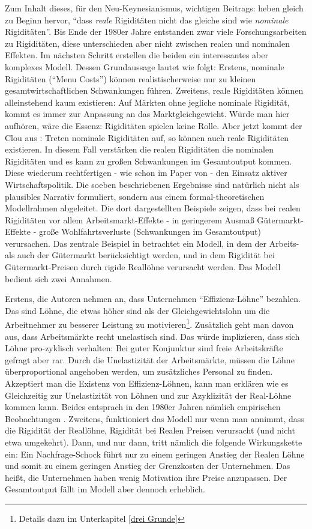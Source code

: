 Zum Inhalt dieses, für den Neu-Keynesianismus, wichtigen Beitrags: \textcite[S. 183]{RomerDavid1990} heben gleich zu Beginn hervor, "`dass \textit{reale} Rigiditäten nicht das gleiche sind wie \textit{nominale} Rigiditäten"'. Bis Ende der 1980er Jahre entstanden zwar viele Forschungsarbeiten zu Rigiditäten, diese unterschieden aber nicht zwischen realen und nominalen Effekten. Im nächsten Schritt erstellen die beiden ein interessantes aber komplexes Modell. Dessen Grundaussage lautet wie folgt: Erstens, nominale Rigiditäten ("`Menu Costs"') können realistischerweise nur zu kleinen gesamtwirtschaftlichen Schwankungen führen. Zweitens, reale Rigiditäten können alleinstehend kaum existieren: Auf Märkten ohne jegliche nominale Rigidität, kommt es immer zur Anpassung an das Marktgleichgewicht. Würde man hier aufhören, wäre die Essenz: Rigiditäten spielen keine Rolle. Aber jetzt kommt der Clou aus \textcite{RomerDavid1990}: Treten nominale Rigiditäten auf, so können auch reale Rigiditäten existieren. In diesem Fall verstärken die realen Rigiditäten die nominalen Rigiditäten und es kann zu großen Schwankungen im Gesamtoutput kommen. Diese wiederum rechtfertigen - wie schon im Paper von \textcite{Akerlof1985} - den Einsatz aktiver Wirtschaftspolitik.
Die soeben beschriebenen Ergebnisse sind natürlich nicht als plausibles Narrativ formuliert, sondern aus einem formal-theoretischen Modellrahmen abgeleitet. Die dort dargestellten Beispiele zeigen, dass bei realen Rigiditäten vor allem Arbeitsmarkt-Effekte - in geringerem Ausmaß Gütermarkt-Effekte - große Wohlfahrtsverluste (Schwankungen im Gesamtoutput) verursachen. Das zentrale Beispiel in \textcite{RomerDavid1990} betrachtet ein Modell, in dem der Arbeits- als auch der Gütermarkt berücksichtigt werden, und in dem Rigidität bei Gütermarkt-Preisen durch rigide Reallöhne verursacht werden. Das Modell bedient sich zwei Annahmen. 

Erstens, die Autoren nehmen an, dass Unternehmen "`Effizienz-Löhne"' bezahlen. Das sind Löhne, die etwas höher sind als der Gleichgewichtslohn um die Arbeitnehmer zu besserer Leistung zu motivieren\footnote{Details dazu im Unterkapitel \ref{drei Grunde}}. Zusätzlich geht man davon aus, dass Arbeitsmärkte recht unelastisch sind. Das würde implizieren, dass sich Löhne pro-zyklisch verhalten: Bei guter Konjunktur sind freie Arbeitskräfte gefragt aber rar. Durch die Unelastizität der Arbeitsmärkte, müssen die Löhne überproportional angehoben werden, um zusätzliches Personal zu finden. Akzeptiert man die Existenz von Effizienz-Löhnen, kann man erklären wie es Gleichzeitig zur Unelastizität von Löhnen und zur Azyklizität der Real-Löhne kommen kann. Beides entsprach in den 1980er Jahren nämlich empirischen Beobachtungen \parencite{RomerDavid1990}. 
Zweitens, funktioniert das Modell nur wenn man annimmt, dass die Rigidität der Reallöhne, Rigidität bei Realen Preisen verursacht (und nicht etwa umgekehrt). Dann, und nur dann, tritt nämlich die folgende Wirkungskette ein: Ein Nachfrage-Schock führt nur zu einem geringen Anstieg der Realen Löhne und somit zu einem geringen Anstieg der Grenzkosten der Unternehmen. Das heißt, die Unternehmen haben wenig Motivation ihre Preise anzupassen. Der Gesamtoutput fällt im Modell aber dennoch erheblich. 

